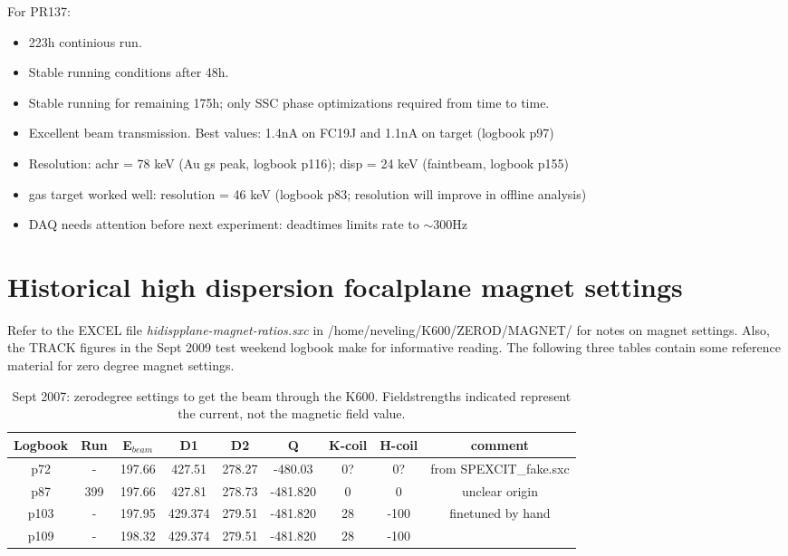 \documentclass[11pt]{report}
\begin{document}
\noindent For PR137:
\begin{itemize}
\item 223h continious run.
\item Stable running conditions after 48h. 
\item Stable running for remaining 175h; only SSC phase optimizations required from time to time.
\item Excellent beam transmission.  Best values: 1.4nA on FC19J  and 1.1nA on target (logbook p97)
\item Resolution: achr = 78 keV (Au gs peak, logbook p116);    disp = 24 keV (faintbeam, logbook p155)   
\item gas target worked well: resolution = 46 keV (logbook p83; resolution will improve in offline analysis)
\item DAQ needs attention before next experiment: deadtimes limits rate to $\sim$300Hz
\end{itemize}



\section{ Historical high dispersion focalplane magnet settings }\label{sec:hidisp_plane_settings}

Refer to the EXCEL file {\it hidispplane-magnet-ratios.sxc} in /home/neveling/K600/ZEROD/MAGNET/
for notes on magnet settings.
Also, the TRACK figures in the Sept 2009 test weekend logbook make for informative reading.
The following three tables contain some reference material for zero degree magnet settings.

\begin{table}[!ht]
\centering
\begin{tabular}{|c|c|c|c|c|c|c|c|c|}
\hline
Logbook & Run & E$_{beam}$ & D1 & D2 & Q & K-coil & H-coil & comment \\
\hline
\hline
p72  & - & 197.66   & 427.51   & 278.27  & -480.03   & 0?  & 0?   & from SPEXCIT\_fake.sxc \\  
p87  & 399 & 197.66 & 427.81   & 278.73  & -481.820  & 0   & 0    & unclear origin \\
p103 & - & 197.95   & 429.374  & 279.51  & -481.820  & 28  & -100 & finetuned by hand\\  
p109 & - & 198.32   & 429.374  & 279.51  & -481.820  & 28  & -100 &   \\  
\hline
\end{tabular}
\caption{Sept 2007: zerodegree settings to get the beam through the K600. 
Fieldstrengths indicated represent the current, not the magnetic field value.}
\label{table:zerod-K600-settings1}
\end{table}
\end{document}
